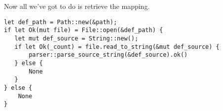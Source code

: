 \documentclass[11pt]{article}
\begin{document}
Now all we've got to do is retrieve the mapping.
\begin{verbatim}
let def_path = Path::new(&path);
if let Ok(mut file) = File::open(&def_path) {
   let mut def_source = String::new();
   if let Ok(_count) = file.read_to_string(&mut def_source) {
       parser::parse_source_string(&def_source).ok()
   } else {
       None
   }
} else {
    None
}
\end{verbatim}
\end{document}
